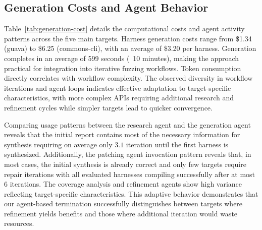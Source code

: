 \subsection{Generation Costs and Agent Behavior}%
\label{subsec:generation-costs}
%

%
Table~\ref{tab:generation-cost} details the computational costs and agent activity patterns across the five main targets. Harness generation costs range from \$1.34 (guava) to \$6.25 (commons-cli), with an average of \$3.20 per harness. Generation completes in an average of 599 seconds (~10 minutes), making the approach practical for integration into iterative fuzzing workflows.
Token consumption directly correlates with workflow complexity. The observed diversity in workflow iterations and agent loops indicates effective adaptation to target-specific characteristics, with more complex APIs requiring additional research and refinement cycles while simpler targets lead to quicker convergence. 
\par
Comparing usage patterns between the research agent and the generation agent reveals that the initial report contains most of the necessary information for synthesis requiring on average only $3.1$ iteration until the first harness is synthesized. Additionally, the patching agent invocation pattern reveals that, in most cases, the initial synthesis is already correct and only few targets require repair iterations with all evaluated harnesses compiling successfully after at most $6$ iterations.
The coverage analysis and refinement agents show high variance reflecting target-specific characteristics.
This adaptive behavior demonstrates that our agent-based termination successfully distinguishes between targets where refinement yields benefits and those where additional iteration would waste resources.



